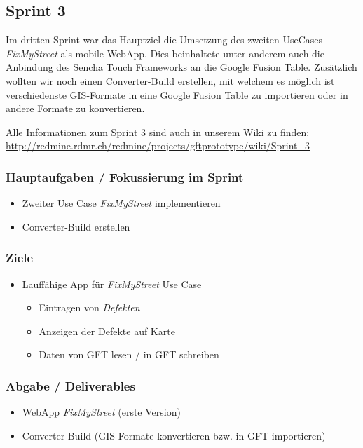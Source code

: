 \subsection{Sprint 3}

Im dritten Sprint war das Hauptziel die Umsetzung des zweiten UseCases \emph{FixMyStreet} als mobile WebApp. Dies beinhaltete unter anderem auch die Anbindung des Sencha Touch Frameworks an die Google Fusion Table.
Zusätzlich wollten wir noch einen Converter-Build erstellen, mit welchem es möglich ist verschiedenste GIS-Formate in eine Google Fusion Table zu importieren oder in andere Formate zu konvertieren.

Alle Informationen zum Sprint 3 sind auch in unserem Wiki zu finden:
\url{http://redmine.rdmr.ch/redmine/projects/gftprototype/wiki/Sprint_3}

\subsubsection{Hauptaufgaben / Fokussierung im Sprint}
\begin{itemize}
	\item Zweiter Use Case \emph{FixMyStreet} implementieren
	\item Converter-Build erstellen
\end{itemize}

\subsubsection{Ziele}
\begin{itemize}
	\item Lauffähige App für \emph{FixMyStreet} Use Case
	\begin{itemize}
		\item Eintragen von \emph{Defekten}
		\item Anzeigen der Defekte auf Karte
		\item Daten von GFT lesen / in GFT schreiben
	\end{itemize}
\end{itemize}

\subsubsection{Abgabe / Deliverables}
\begin{itemize}
	\item WebApp \emph{FixMyStreet} (erste Version)
	\item Converter-Build (GIS Formate konvertieren bzw. in GFT importieren)
\end{itemize}

